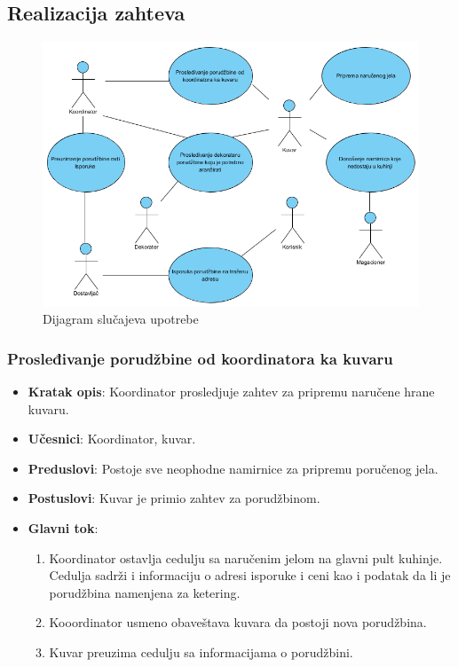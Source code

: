 \subsection{Realizacija zahteva}
\begin{figure}[ht]
    \leavevmode
    \begin{center}
    \includegraphics[height=0.6\textheight]{slike/Realizacija_zahteva.png}
    \end{center}
    \caption{Dijagram slu\v cajeva upotrebe} %
    \label{fig:slika4}
\end{figure}
\subsubsection{Prosleđivanje porudžbine od koordinatora ka kuvaru}
\begin{itemize}
    \item \textbf{Kratak opis}:
    Koordinator prosledjuje zahtev za pripremu naručene hrane kuvaru.
    \item \textbf{Učesnici}:
    Koordinator, kuvar.
    \item \textbf{Preduslovi}:
    Postoje sve neophodne namirnice za pripremu poručenog jela.
    \item \textbf{Postuslovi}:
    Kuvar je primio zahtev za porudžbinom.
    \item \textbf{Glavni tok}:
   \begin{enumerate}
        \item Koordinator ostavlja cedulju sa naručenim jelom na glavni pult kuhinje. Cedulja sadrži i informaciju o adresi isporuke i ceni kao i podatak da li je porudžbina namenjena za ketering.
        \item Kooordinator usmeno obaveštava kuvara da postoji nova porudžbina.
        \item Kuvar preuzima cedulju sa informacijama o porudžbini.
\end{enumerate}
\end{itemize}

